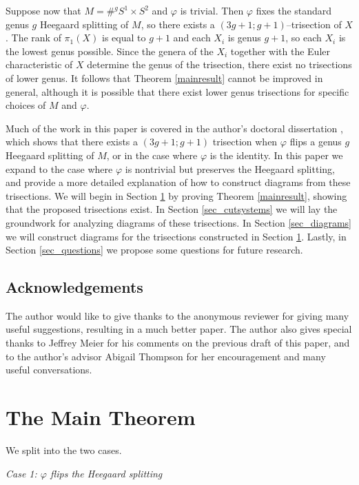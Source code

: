 \documentclass[12pt]{amsart}
\theoremstyle{definition}
\theoremstyle{remark}
\begin{document}
Suppose now that $M = \#^g S^1 \times S^2$ and $\varphi$ is trivial.
Then $\varphi$ fixes the standard genus $g$ Heegaard splitting of $M$, so there exists a $(3g+1;g+1)$--trisection of $X$.
The rank of $\pi_1(X)$ is equal to $g+1$ and each $X_i$ is genus $g+1$,  so each $X_i$ is the lowest genus possible.
Since the genera of the $X_i$ together with the Euler characteristic of $X$ determine the genus of the trisection, there exist no trisections of lower genus.
It follows that Theorem \ref{mainresult} cannot be improved in general, although it is possible that there exist lower genus trisections for specific choices of $M$ and $\varphi$.

Much of the work in this paper is covered in the author's doctoral dissertation \cite{koenig1}, which shows that there exists a $(3g+1;g+1)$ trisection when $\varphi$ flips a genus $g$ Heegaard splitting of $M$, or in the case where $\varphi$ is the identity.
In this paper we expand to the case where $\varphi$ is nontrivial but preserves the Heegaard splitting, and provide a more detailed explanation of how to construct diagrams from these trisections.
We will begin in Section \ref{sec_mainthm} by proving Theorem \ref{mainresult}, showing that the proposed trisections exist.
In Section \ref{sec_cutsystems} we will lay the groundwork for analyzing diagrams of these trisections.
In Section \ref{sec_diagrams} we will construct diagrams for the trisections constructed in Section \ref{sec_mainthm}.
Lastly, in Section \ref{sec_questions} we propose some questions for future research.

\subsection*{Acknowledgements} The author would like to give thanks to the anonymous reviewer for giving many useful suggestions, resulting in a much better paper.
The author also gives special thanks to  Jeffrey Meier for his comments on the previous draft of this paper, and to the author's advisor Abigail Thompson for her encouragement and many useful conversations.


\section{The Main Theorem}
\label{sec_mainthm}

We split into the two cases.

\smallskip
\noindent\textit{Case 1: $\varphi$ flips the Heegaard splitting}\ \
\end{document}
